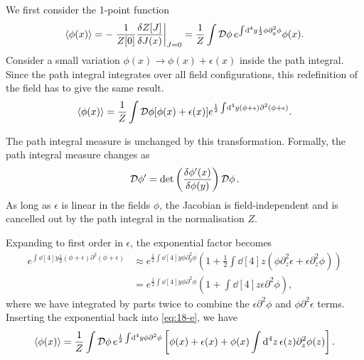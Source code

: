 We first consider the 1-point function
\begin{equation}
  \label{eq:18-1pt}
  \langle \phi(x) \rangle = -\left.\frac{1}{Z[0]}\frac{\delta Z[J]}{\delta J(x)} \right\rvert_{J = 0} = \frac{1}{Z} \int \mathop{\mathcal{D} \phi} e^{\int \dd[4]{y} \frac{1}{2} \phi \partial^2_y \phi} \phi(x).
\end{equation}
Consider a small variation $\phi(x) \to \phi(x) + \epsilon(x)$ inside the path integral.
Since the path integral integrates over all field configurations, this redefinition of the field has to give the same result.
\begin{equation}
  \label{eq:18-e}
  \langle \phi(x) \rangle = \frac{1}{Z} \int \mathop{\mathcal{D} \phi} [\phi(x) + \epsilon(x)] e^{\frac{1}{2} \int \dd[4]{y} (\phi + \epsilon) \partial^2 (\phi + \epsilon)}.
\end{equation}
\begin{leftbar}
  \begin{remark}
    The path integral measure is unchanged by this transformation.
    Formally, the path integral measure changes as
    \begin{equation}
      \mathop{\mathcal{D} \phi'} = \det \left( \frac{\delta \phi'(x)}{\delta \phi(y)} \right) \mathop{\mathcal{D} \phi}.
    \end{equation}
    As long as $\epsilon$ is linear in the fields $\phi$, the Jacobian is field-independent and is cancelled out by the path integral in the normalisation $Z$.
  \end{remark}
\end{leftbar}
Expanding to first order in $\epsilon$, the exponential factor becomes
\begin{align}
  e^{\int \dd[4]{y} \frac{1}{2} (\phi + \epsilon) \partial^2 (\phi + \epsilon)} &\approx e^{\frac{1}{2} \int \dd[4]{y} \phi \partial^2_y \phi} \left( 1 + \frac{1}{2} \int \dd[4]{z} (\phi \partial^2_z \epsilon + \epsilon \partial^2_z \phi) \right) \\
										&= e^{\frac{1}{2} \int \dd[4]{y} \phi \partial^2 \phi} \left( 1 + \int \dd[4]{z} \epsilon \partial^2 \phi \right),
\end{align}
where we have integrated by parts twice to combine the $\epsilon \partial^2 \phi$ and $\phi \partial^2 \epsilon$ terms.
Inserting the exponential back into \eqref{eq:18-e}, we have
\begin{equation}
  \label{eq:18-2}
  \langle \phi(x) \rangle = \frac{1}{Z} \int \mathop{\mathcal{D} \phi} e^{\frac{1}{2} \int \dd[4]{y} \phi \partial^2 \phi} \left[ \phi(x) + \epsilon(x) + \phi(x) \int \dd[4]{z} \epsilon(z) \partial^2_z \phi(z) \right].
\end{equation}
